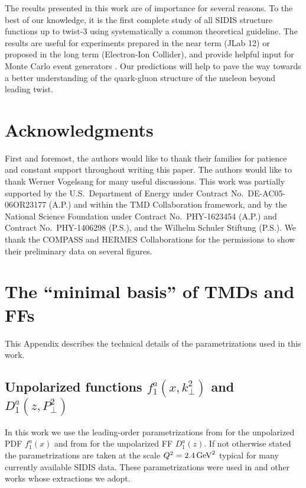 \documentclass[a4paper,11pt]{article}
\newcommand{\blue}[1]{{\color{blue} #1}}
\newcommand{\ps}[1]{\blue{#1}}
\begin{document}
The results presented in this work are of importance for several reasons.
To the best of our knowledge, it is the first complete study of all SIDIS
structure functions up to twist-3 %
\ps{using systematically a common theoretical guideline.}
The results are
useful for experiments prepared in the near term (JLab 12) or proposed
in the long term (Electron-Ion Collider), and provide helpful input for
Monte Carlo event generators \cite{Avakian:2015vha}.
Our predictions will help to pave the way
towards a better understanding of the quark-gluon structure
of the nucleon beyond leading twist.



\section{Acknowledgments}
First and foremost, the authors would like to thank their families
for patience and constant support throughout writing this paper.
The authors would like to thank Werner Vogelsang for many useful
discussions. This work was partially supported by the U.S.\
Department of Energy under Contract No.~DE-AC05-06OR23177 (A.P.)
and within the TMD Collaboration framework, and by the National
Science Foundation under Contract No.\ PHY-1623454 (A.P.) and
Contract No.\ PHY-1406298 (P.S.), and the Wilhelm Schuler Stiftung (P.S.).
\ps{We thank the COMPASS and HERMES Collaborations for the 
permissions to show their preliminary data on several figures.}



\appendix

\section{\boldmath The ``minimal basis'' of TMDs and FFs}
\label{App:basis}

This Appendix describes the technical details of the parametrizations
used in this work.

\subsection{\boldmath Unpolarized functions $f_1^a(x,k_\perp^2)$
			and $D_1^a(z,P_\perp^2)$}
\label{App:basis-f1-D1}

In this work we use the leading-order parametrizations
from \cite{Martin:2009iq} for the unpolarized PDF $f_1^a(x)$ and
from \cite{deFlorian:2007aj} for the unpolarized FF $D_1^a(z)$.
If not otherwise stated the parametrizations are taken at the scale
$Q^2=2.4\,{\rm GeV}^2$ typical for many currently available SIDIS data.
These parametrizations were used in \cite{Anselmino:2005nn} and other
works whose extractions we adopt.
\end{document}
